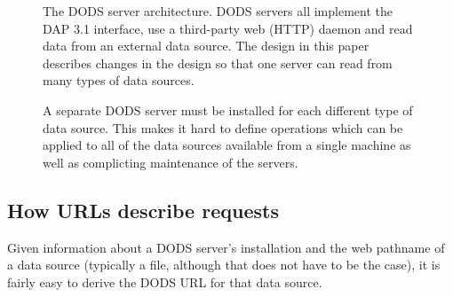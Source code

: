 \documentclass{article}
\begin{document}
\begin{figure}[h]
\begin{center}
\caption{The DODS server architecture. DODS servers all implement the DAP 3.1
  interface, use a third-party web (HTTP) daemon and read data from an
  external data source. The design in this paper describes changes in the
  design so that one server can read from many types of data sources.}
\label{fig:dods-server}
\end{center}
\end{figure}

\begin{figure}
\begin{center}
\caption{A separate DODS server must be installed for each different type of
  data source. This makes it hard to define operations which can be applied to
  all of the data sources available from a single machine as well as
  complicting maintenance of the servers.}
\label{fig:current-deployment}
\end{center}
\end{figure}

\subsection{How URLs describe requests}

Given information about a DODS server's installation and the web pathname
 of a data source (typically a file, although that
does not have to be the case), it is fairly easy to derive the DODS URL for
that data source. 
\end{document}

